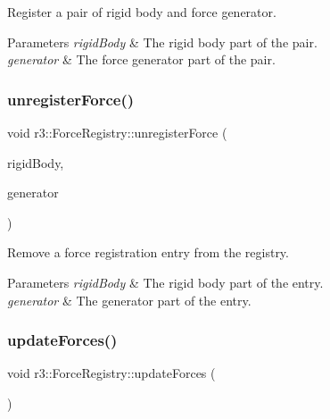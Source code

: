 Register a pair of rigid body and force generator. 


\begin{DoxyParams}{Parameters}
{\em rigid\+Body} & The rigid body part of the pair. \\
\hline
{\em generator} & The force generator part of the pair. \\
\hline
\end{DoxyParams}
\mbox{\label{classr3_1_1_force_registry_a8fcc46a35435ffb74c471a0a5ff36a7f}} 
\subsubsection{\texorpdfstring{unregister\+Force()}{unregisterForce()}}
{\footnotesize\ttfamily void r3\+::\+Force\+Registry\+::unregister\+Force (\begin{DoxyParamCaption}\item[{\mbox{\hyperlink{classr3_1_1_rigid_body}{Rigid\+Body}} $\ast$}]{rigid\+Body,  }\item[{\mbox{\hyperlink{classr3_1_1_force_generator}{Force\+Generator}} $\ast$}]{generator }\end{DoxyParamCaption})}



Remove a force registration entry from the registry. 


\begin{DoxyParams}{Parameters}
{\em rigid\+Body} & The rigid body part of the entry. \\
\hline
{\em generator} & The generator part of the entry. \\
\hline
\end{DoxyParams}
\mbox{\label{classr3_1_1_force_registry_a468b4b100cd4351039edc68b9f7145ab}} 
\subsubsection{\texorpdfstring{update\+Forces()}{updateForces()}}
{\footnotesize\ttfamily void r3\+::\+Force\+Registry\+::update\+Forces (\begin{DoxyParamCaption}{ }\end{DoxyParamCaption})}



